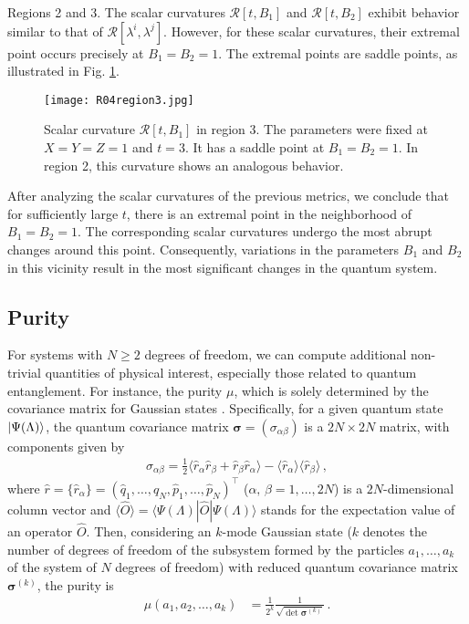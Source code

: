 \documentclass[12pt]{iopart}
\DeclarePairedDelimiter\ket{\lvert}{\rangle}
\begin{document}
Regions 2 and 3. The scalar curvatures $\mathcal{R}[t,B_1]$ and $\mathcal{R}[t,B_2]$ exhibit behavior similar to that of $\mathcal{R}[\lambda^i,\lambda^j]$. However, for these scalar curvatures, their extremal point occurs precisely at $B_1=B_2=1$. The extremal points are saddle points, as illustrated in Fig. \ref{fig:R04region3}.

\begin{figure}[h!]
    \centering
    \texttt{[image: R04region3.jpg]}
     \captionsetup{font=small} 
  \caption{\justifying Scalar curvature $\mathcal{R}[t, B_1]$ in region 3. The parameters were fixed at $X=Y=Z=1$ and $t=3$. It has a saddle point at $B_1=B_2=1$. In region 2, this curvature shows an analogous behavior. }    \label{fig:R04region3}
\end{figure}

After analyzing the scalar curvatures of the previous metrics, we conclude that for sufficiently large $t$, there is an extremal point in the neighborhood of $B_1=B_2=1$. The corresponding scalar curvatures undergo the most abrupt changes around this point. Consequently, variations in the parameters $B_1$ and $B_2$ in this vicinity result in the most significant changes in the quantum system.



\subsection{Purity}


For systems with $N\geq 2$ degrees of freedom, we can compute additional non-trivial quantities of physical interest, especially those related to quantum entanglement. For instance, the purity $\mu$, which is solely determined by the covariance matrix for Gaussian states \cite{Agarwal1971, Holevo1999, Dodonov_2002, Paris2003, deGosson2006, diosi2011, Golubeva2014, serafini2017, deGosson2019, Demarie2018}. Specifically, for a given quantum state  $\ket{\Psi(\Lambda)}$, the quantum covariance matrix $\boldsymbol{\sigma} = (\sigma_{\alpha \beta})$ is a $2N\times 2N$ matrix, with components given by
\begin{align}
\sigma_{\alpha \beta} = \frac{1}{2} \langle \hat{r}_{\alpha} \hat{r}_{\beta} + \hat{r}_{\beta} \hat{r}_{\alpha}  \rangle-\langle \hat{r}_{\alpha}\rangle \langle \hat{r}_{\beta} \rangle\,, \label{qumet}
\end{align}
where $\hat{r}=\{\hat{r}_{\alpha}\}=(\hat{q}_1,\dots,\hat{q}_N,\hat{p}_1,\dots,\hat{p}_N)^{\intercal}$ ($\alpha,\, \beta =1,\dots,2N$) is a $2N$-dimensional column vector  and $ \langle \hat{O} \rangle=\langle  \Psi(\Lambda) | \hat{O} | \Psi(\Lambda) \rangle$ stands for the expectation value of an operator $\hat{O}$.
Then, considering an $k$-mode Gaussian state ($k$ denotes the number of degrees of freedom of the subsystem formed by the particles $a_1,\dots,a_k$ of the system of $N$ degrees of freedom) with reduced quantum covariance matrix $\boldsymbol{\sigma}^{(k)}$, the purity is
\begin{align}
\mu \left(a_1,a_2,\dots,a_k\right)&= \frac{1}{2^k} \frac{1}{\sqrt{\det \boldsymbol{\sigma}^{(k)} }}\,. \label{eq:qpu}
\end{align}
\end{document}
